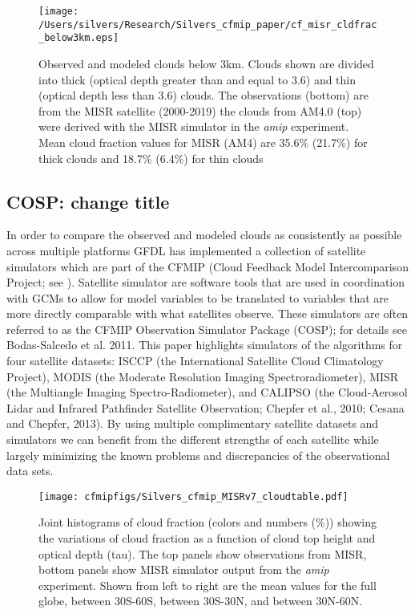 \documentclass[draft]{agujournal2019}
\begin{document}
\begin{figure}
  \centering
  \texttt{[image: /Users/silvers/Research/Silvers\_cfmip\_paper/cf\_misr\_cldfrac\_below3km.eps]}
  \caption{Observed and modeled clouds below 3km.  Clouds shown are divided into thick 
  (optical depth greater than and equal to 3.6) and thin (optical depth less than 3.6) 
  clouds.  The observations (bottom) are from the MISR satellite (2000-2019) the clouds from AM4.0 (top) were derived 
  with the MISR simulator in the \textit{amip} experiment. Mean cloud fraction values for MISR 
  (AM4) are 35.6\% (21.7\%) for thick clouds and 18.7\% (6.4\%) for thin clouds}
  \label{fig:cf_misr_lowcl}
\end{figure}

\subsection{COSP: change title}
In order to compare the observed and modeled clouds as consistently as possible across multiple platforms 
GFDL has implemented a collection of satellite simulators which are part of the 
CFMIP (Cloud Feedback Model Intercomparison Project; see \cite{Webb_etal_2017}).  Satellite simulator
are software tools that are used in coordination with GCMs to allow for model variables 
to be translated to variables that are more directly comparable with what satellites observe.  
These simulators are often referred to as the CFMIP Observation Simulator Package (COSP); for
details see Bodas-Salcedo et al. 2011.  This paper highlights simulators of the algorithms for 
four satellite datasets: ISCCP (the International Satellite Cloud Climatology Project), 
MODIS (the Moderate Resolution Imaging Spectroradiometer), 
MISR (the Multiangle Imaging Spectro-Radiometer), and 
CALIPSO (the Cloud-Aerosol Lidar and Infrared Pathfinder Satellite Observation; 
Chepfer et al., 2010; Cesana and Chepfer, 2013).  By using multiple complimentary satellite 
datasets and simulators we can benefit from the different strengths of each satellite while largely 
minimizing the known problems and discrepancies of the observational data sets.      

\begin{figure}
  \centering
  \texttt{[image: cfmipfigs/Silvers\_cfmip\_MISRv7\_cloudtable.pdf]}
  \caption{Joint histograms of cloud fraction (colors and numbers (\%)) showing the variations of cloud fraction 
  as a function of cloud top height and optical depth (tau).
  The top panels show observations from MISR, bottom panels show MISR simulator output from the 
  \textit{amip} experiment.  Shown from left to right are the mean values for the full globe, between 30S-60S,
  between 30S-30N, and between 30N-60N.}
  \label{fig:misr_sim_vs_mod}
\end{figure}
\end{document}
